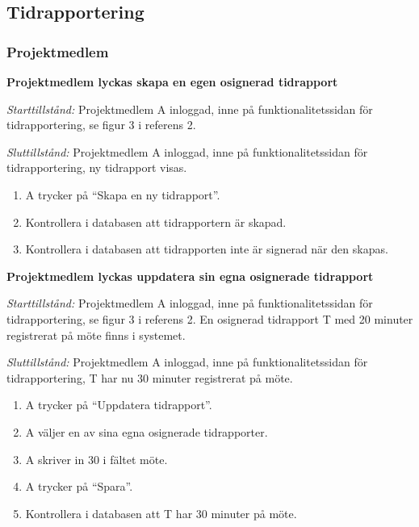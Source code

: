 \documentclass[a4paper]{article}
\begin{document}

\subsection{Tidrapportering}

\subsubsection{Projektmedlem}

\begin{FT}

\item\textbf{Projektmedlem lyckas skapa en egen osignerad tidrapport}

\emph{Starttillstånd:} Projektmedlem A inloggad, inne på funktionalitetssidan för tidrapportering, se figur 3 i referens 2.

\emph{Sluttillstånd:} Projektmedlem A inloggad, inne på funktionalitetssidan för tidrapportering, ny tidrapport visas.

\begin{enumerate}
\item A trycker på ``Skapa en ny tidrapport''.
\item Kontrollera i databasen att tidrapportern är skapad.
\item Kontrollera i databasen att tidrapporten inte är signerad när den skapas.
\end{enumerate}


\item\textbf{Projektmedlem lyckas uppdatera sin egna osignerade tidrapport}

\emph{Starttillstånd:} Projektmedlem A inloggad, inne på funktionalitetssidan för tidrapportering, se figur 3 i referens 2. En osignerad tidrapport T med 20 minuter registrerat på möte finns i systemet.

\emph{Sluttillstånd:} Projektmedlem A inloggad, inne på funktionalitetssidan för tidrapportering, T har nu 30 minuter registrerat på möte.

\begin{enumerate}
\item A trycker på ``Uppdatera tidrapport''.
\item A väljer en av sina egna osignerade tidrapporter.
\item A skriver in 30 i fältet möte.
\item A trycker på ``Spara''.
\item Kontrollera i databasen att T har 30 minuter på möte.
\end{enumerate}



\end{FT}
\end{document}
